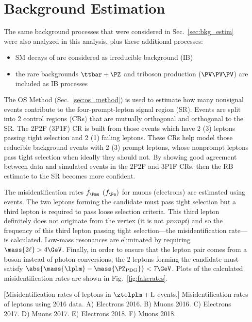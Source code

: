 \section{Background Estimation}
\label{sec:bkg_estim_dilep}
The same background processes that were considered in Sec.~\ref{sec:bkg_estim} were also analyzed in this analysis, plus these additional processes:
\begin{itemize}
    \item SM decays of \htofourl are considered as irreducible background (IB)
    \item the rare backgrounds $\ttbar + \PZ$ and triboson production ($\PV\PV\PV$) are included as IB processes
\end{itemize}

The OS Method (Sec.~\ref{sec:os_method}) is used to estimate how many nonsignal events contribute to the four-prompt-lepton signal region (SR).
Events are split into 2 control regions (CRs) that are mutually orthogonal and orthogonal to the SR.
The 2P2F (3P1F) CR is built from those events which have 2 (3) leptons passing tight selection and 2 (1) failing leptons.
These CRs help model those reducible background events with 2 (3) prompt leptons, whose nonprompt leptons pass tight selection when ideally they should not.
By showing good agreement between data and simulated events in the 2P2F and 3P1F CRs, then the RB estimate to the SR becomes more confident.

The misidentification rates $f_{\Pmu}$ $(f_{\Pe})$ for muons (electrons) are estimated using \ztolplm events.
The two leptons forming the \PZ candidate must pass tight selection but a third lepton is required to pass loose selection criteria.
This third lepton definitely does not originate from the \PZ vertex (\ie it is not \emph{prompt}) and so the frequency of this third lepton passing tight selection---the misidentification rate---is calculated.
Low-mass resonances are eliminated by requiring $\mass{2\ell} > 4\GeV$.
Finally, in order to ensure that the lepton pair comes from a \PZ boson instead of photon conversions, the 2 leptons forming the \PZ candidate must satisfy $\abs{\mass{\lplm} - \mass{\PZ_{\text{PDG}}}} < 7\GeV$.
Plots of the calculated misidentification rates are shown in Fig.~\ref{fig:fakerates}.
\begin{multiFigure}
        [Misidentification rates of leptons in $\ztolplm + \text{L}$ events.]
        {Misidentification rates of leptons using 2016 data.  %
        A) Electrons 2016.
        B) Muons 2016.
        C) Electrons 2017.
        D) Muons 2017.
        E) Electrons 2018.
        F) Muons 2018.
        }
    \label{fig:fakerates}
\end{multiFigure}